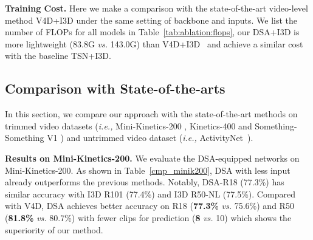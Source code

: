 \documentclass[sigconf]{acmart}
\begin{document}
\textbf{Training Cost.}
Here we make a comparison with the state-of-the-art video-level method V4D+I3D under the same setting of backbone and inputs. 
We list the number of FLOPs for all models in Table~\ref{tab:ablation:flops}, our DSA+I3D is more lightweight (83.8G \emph{vs.} 143.0G) than V4D+I3D~\cite{zhang2020v4d} and achieve a similar cost with the baseline TSN+I3D. 








\subsection{Comparison with State-of-the-arts}
In this section, we compare our approach with the state-of-the-art methods on trimmed video datasets (\emph{i.e.,} Mini-Kinetics-200 \cite{s3d}, Kinetics-400 \cite{kay2017kinetics} and Something-Something V1 \cite{sth-sth}) and untrimmed video dataset (\emph{i.e.,} ActivityNet~\cite{caba2015activitynet}).

\textbf{Results on Mini-Kinetics-200.} 
We evaluate the DSA-equipped networks on Mini-Kinetics-200. 
As shown in Table~\ref{cmp_minik200}, DSA with less input already outperforms the previous methods. Notably, DSA-R18 (77.3\%) has similar accuracy with I3D R101 (77.4\%) and I3D R50-NL (77.5\%). Compared with V4D, DSA achieves better accuracy on R18 (\textbf{77.3\%} \emph{vs.} 75.6\%) and R50 (\textbf{81.8\%} \emph{vs.} 80.7\%) with fewer clips for prediction (\textbf{8} \emph{vs.} 10) which shows the superiority of our method.
\end{document}
